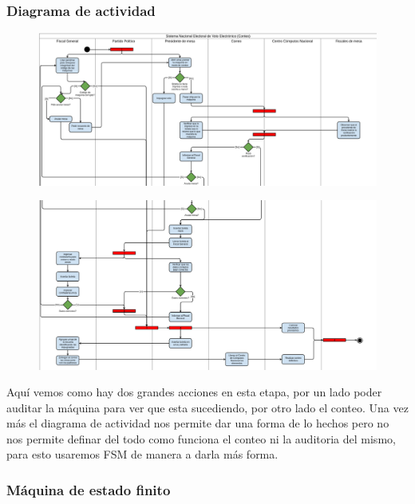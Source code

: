 \subsubsection{Diagrama de actividad}
\begin{figure}[h!]
\centering
\includegraphics[scale=0.5]{imagenes/actividad/actividadConteo1}
\end{figure}			

\begin{figure}[h!]
\centering
\includegraphics[scale=0.5]{imagenes/actividad/actividadConteo2}
\end{figure}

Aquí vemos como hay dos grandes acciones en esta etapa, por un lado poder auditar la máquina para ver que esta sucediendo, por otro lado el conteo. Una vez más el diagrama de actividad nos permite dar una forma de lo hechos pero no nos permite definar del todo como funciona el conteo ni la auditoria del mismo, para esto usaremos FSM de manera a darla más forma.

\subsubsection{Máquina de estado finito}

